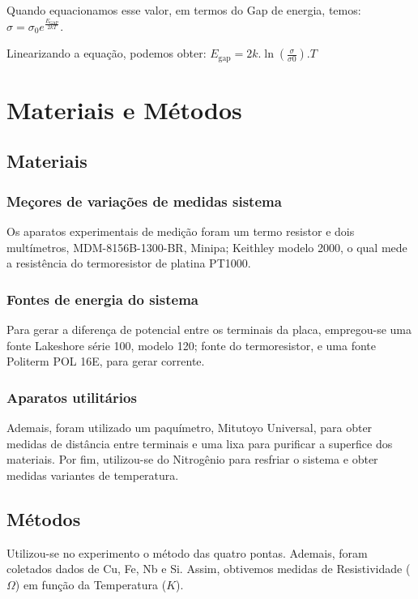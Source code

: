 \documentclass[11pt]{article}
\begin{document}
Quando equacionamos esse valor, em termos do Gap de energia, temos:
\(\sigma = \sigma_0 e^{\frac{E_{\textrm{GAP}}}{2kT}}\).

Linearizando a equação, podemos obter:
\(E_{\textrm{gap}} = 2k.\ln{(\frac{\sigma}{\sigma0})}.T\)


\section{Materiais e Métodos}
\label{sec:org286d17a}
\subsection{Materiais}
\label{sec:orgec19cb2}
\subsubsection{Meçores de variações de medidas sistema}
\label{sec:orgb04b2e3}
Os aparatos experimentais de medição foram um termo resistor e dois
multímetros, MDM-8156B-1300-BR, Minipa; Keithley modelo 2000, o qual mede a
resistência do termoresistor de platina PT1000.

\subsubsection{Fontes de energia do sistema}
\label{sec:orgc20ba61}
Para gerar a diferença de potencial entre os terminais da placa,
empregou-se uma fonte Lakeshore série 100, modelo 120; fonte do termoresistor,
e uma fonte Politerm POL 16E, para gerar corrente.

\subsubsection{Aparatos utilitários}
\label{sec:org0b066b6}
Ademais, foram utilizado um paquímetro, Mitutoyo Universal, para obter medidas
de distância entre terminais e uma lixa para purificar a superfice
dos materiais. Por fim, utilizou-se do Nitrogênio para resfriar o
sistema e obter medidas variantes de temperatura.

\subsection{Métodos}
\label{sec:orgf6fd7f7}
Utilizou-se no experimento o método das quatro pontas. Ademais,
foram coletados dados de Cu, Fe, Nb e Si. Assim, obtivemos medidas
de Resistividade (\(\Omega\)) em função da Temperatura (\(K\)).
\end{document}
